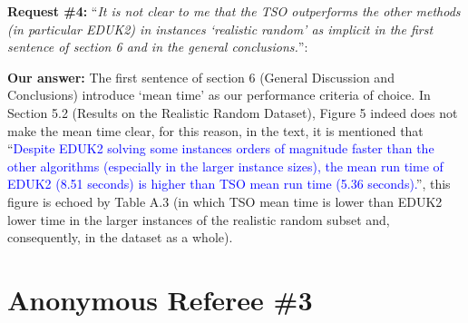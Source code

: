 \documentclass{elsarticle}
\begin{document}
\textbf{Request \#4:} ``\textit{It is not clear to me that the TSO outperforms the other methods (in particular EDUK2) in instances `realistic random' as implicit in the first sentence of section 6 and in the general conclusions.}'':

\textbf{Our answer:} The first sentence of section 6 (General Discussion and Conclusions) introduce `mean time' as our performance criteria of choice. In Section 5.2 (Results on the Realistic Random Dataset), Figure 5 indeed does not make the mean time clear, for this reason, in the text, it is mentioned that ``\textcolor{blue}{Despite EDUK2 solving some instances orders of magnitude faster than the other algorithms (especially in the larger instance sizes), the mean run time of EDUK2 (8.51 seconds) is higher than TSO mean run time (5.36 seconds).}'', this figure is echoed by Table A.3 (in which TSO mean time is lower than EDUK2 lower time in the larger instances of the realistic random subset and, consequently, in the dataset as a whole).
\medskip

\section{Anonymous Referee \#3}
\end{document}
